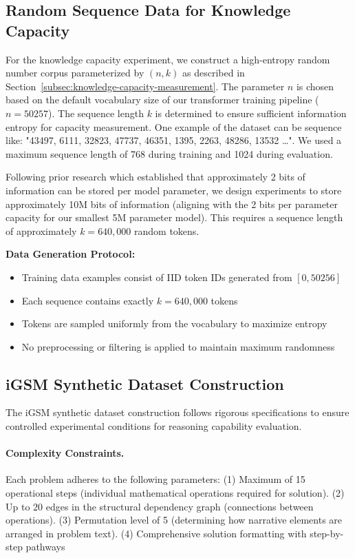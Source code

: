 \documentclass{article} %
\begin{document}
\subsection{Random Sequence Data for Knowledge Capacity} \label{subsec:random_data}

For the knowledge capacity experiment, we construct a high-entropy random number corpus parameterized by $(n,k)$ as described in Section~\ref{subsec:knowledge-capacity-measurement}. The parameter $n$ is chosen based on the default vocabulary size of our transformer training pipeline ($n = 50257$). The sequence length $k$ is determined to ensure sufficient information entropy for capacity measurement.  One example of the dataset can be sequence like: "43497, 6111, 32823, 47737, 46351, 1395, 2263, 48286, 13532 …". We used a maximum sequence length of 768 during training and 1024 during evaluation.

Following prior research \citep{allen2024physics} which established that approximately 2 bits of information can be stored per model parameter, we design experiments to store approximately 10M bits of information (aligning with the 2 bits per parameter capacity for our smallest 5M parameter model). This requires a sequence length of approximately $k = 640{,}000$ random tokens.

\textbf{Data Generation Protocol:}
\begin{itemize}
    \item Training data examples consist of IID token IDs generated from $[0, 50256]$
    \item Each sequence contains exactly $k = 640{,}000$ tokens
    \item Tokens are sampled uniformly from the vocabulary to maximize entropy
    \item No preprocessing or filtering is applied to maintain maximum randomness
\end{itemize}

\subsection{iGSM Synthetic Dataset Construction} \label{subsec:igsm_data}

The iGSM synthetic dataset construction follows rigorous specifications to ensure controlled experimental conditions for reasoning capability evaluation.

\paragraph{Complexity Constraints.} Each problem adheres to the following parameters: (1) Maximum of 15 operational steps (individual mathematical operations required for solution). (2) Up to 20 edges in the structural dependency graph (connections between operations). (3) Permutation level of 5 (determining how narrative elements are arranged in problem text). (4) Comprehensive solution formatting with step-by-step pathways
\end{document}
